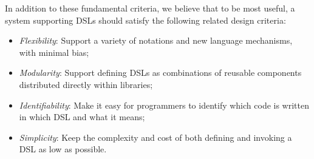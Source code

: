 
In addition to these fundamental criteria, we believe that to be most useful, a system supporting DSLs should satisfy the following related design criteria:

\begin{itemize}
\item \emph{Flexibility}: Support a variety of notations and new language mechanisms, with minimal bias;
\item \emph{Modularity}: Support defining DSLs as combinations of reusable components distributed directly within  libraries;
\item \emph{Identifiability}: Make it easy for programmers to identify which code is written in which DSL and what it means;
\item \emph{Simplicity}: Keep the complexity and cost of both defining and invoking a DSL as low as possible.
\end{itemize}

